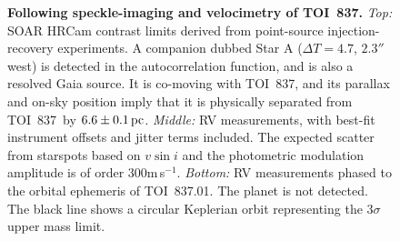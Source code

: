 \documentclass[12pt,twocolumn,tighten]{aastex63}
\newcommand{\tn}{TOI~837} %
\newcommand{\pn}{TOI~837.01} %
\begin{document}
\begin{figure}[!t]
	\begin{center}
		\leavevmode
		
		\vspace{-0.5cm}
	\end{center}
	\vspace{-0.6cm}
	\caption{
    {\bf Following speckle-imaging and velocimetry of \tn.} {\it Top:}
    SOAR HRCam contrast limits derived from point-source
    injection-recovery experiments. A companion dubbed Star A ($\Delta
    T=4.7$, $2.3''$ west) is detected in the autocorrelation function,
    and is also a resolved Gaia source.  It is co-moving with \tn, and
    its parallax and on-sky position imply that it is physically
    separated from \tn\ by $6.6\pm 0.1\,{\rm pc}$.  {\it Middle:} RV
    measurements, with best-fit instrument offsets and jitter terms
    included.  The expected scatter from starspots based on $v\sin i$
    and the photometric modulation amplitude is of order
    300m$\,$s$^{-1}$.  {\it Bottom:} RV measurements phased to the
    orbital ephemeris of \pn.  The planet is not detected.  The black
    line shows a circular Keplerian orbit representing the $3\sigma$
    upper mass limit.
		\label{fig:followup}
	}
\end{figure}
\end{document}
